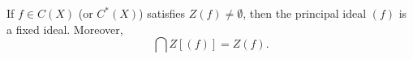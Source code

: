 If $f \in C(X)$ (or $C^*(X)$) satisfies $Z(f) \neq \emptyset$, then the principal ideal $(f)$ is a fixed ideal. Moreover,
$$\bigcap Z[(f)] = Z(f).$$
